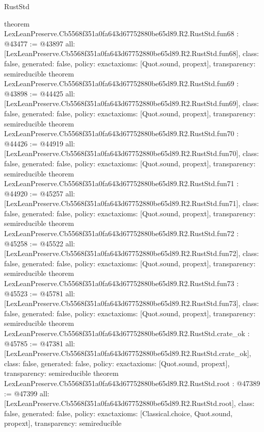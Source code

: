 \begin{lexlean}{RustStd}
\begin{coremodule}
{}
theorem LexLeanPreserve.Cb5568f351a0fa643d67752880be65d89.R2.RustStd.fun68 : @43477 := @43897 {
  all: [LexLeanPreserve.Cb5568f351a0fa643d67752880be65d89.R2.RustStd.fun68],
  class: false,
  generated: false,
  policy: exact{axioms: [Quot.sound, propext]},
  transparency: semireducible
}
theorem LexLeanPreserve.Cb5568f351a0fa643d67752880be65d89.R2.RustStd.fun69 : @43898 := @44425 {
  all: [LexLeanPreserve.Cb5568f351a0fa643d67752880be65d89.R2.RustStd.fun69],
  class: false,
  generated: false,
  policy: exact{axioms: [Quot.sound, propext]},
  transparency: semireducible
}
theorem LexLeanPreserve.Cb5568f351a0fa643d67752880be65d89.R2.RustStd.fun70 : @44426 := @44919 {
  all: [LexLeanPreserve.Cb5568f351a0fa643d67752880be65d89.R2.RustStd.fun70],
  class: false,
  generated: false,
  policy: exact{axioms: [Quot.sound, propext]},
  transparency: semireducible
}
theorem LexLeanPreserve.Cb5568f351a0fa643d67752880be65d89.R2.RustStd.fun71 : @44920 := @45257 {
  all: [LexLeanPreserve.Cb5568f351a0fa643d67752880be65d89.R2.RustStd.fun71],
  class: false,
  generated: false,
  policy: exact{axioms: [Quot.sound, propext]},
  transparency: semireducible
}
theorem LexLeanPreserve.Cb5568f351a0fa643d67752880be65d89.R2.RustStd.fun72 : @45258 := @45522 {
  all: [LexLeanPreserve.Cb5568f351a0fa643d67752880be65d89.R2.RustStd.fun72],
  class: false,
  generated: false,
  policy: exact{axioms: [Quot.sound, propext]},
  transparency: semireducible
}
theorem LexLeanPreserve.Cb5568f351a0fa643d67752880be65d89.R2.RustStd.fun73 : @45523 := @45781 {
  all: [LexLeanPreserve.Cb5568f351a0fa643d67752880be65d89.R2.RustStd.fun73],
  class: false,
  generated: false,
  policy: exact{axioms: [Quot.sound, propext]},
  transparency: semireducible
}
theorem LexLeanPreserve.Cb5568f351a0fa643d67752880be65d89.R2.RustStd.crate_ok : @45785 := @47381 {
  all: [LexLeanPreserve.Cb5568f351a0fa643d67752880be65d89.R2.RustStd.crate_ok],
  class: false,
  generated: false,
  policy: exact{axioms: [Quot.sound, propext]},
  transparency: semireducible
}
theorem LexLeanPreserve.Cb5568f351a0fa643d67752880be65d89.R2.RustStd.root : @47389 := @47399 {
  all: [LexLeanPreserve.Cb5568f351a0fa643d67752880be65d89.R2.RustStd.root],
  class: false,
  generated: false,
  policy: exact{axioms: [Classical.choice, Quot.sound, propext]},
  transparency: semireducible
}


\end{coremodule}
\end{lexlean}
